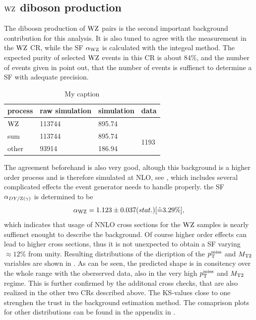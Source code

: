 \subsection{$\mathrm{W}\mathrm{Z}$ diboson production}
The diboosn production of $\mathrm{W}\mathrm{Z}$ pairs is the second important background contribution for this analysis. It is also tuned to agree with the measurement in the $\mathrm{W}\mathrm{Z}$ CR, while the SF $\alpha_{\mathrm{W}\mathrm{Z}}$ is calculated with the integeal method. The expected purity of selected $\mathrm{W}\mathrm{Z}$ events in this CR is about $84\%$, and the number of events given in  point out, that the number of events is suffienct to determine a SF with adequate precision.
\begin{table}[htb]
 \centering
 \caption{My caption}
 \label{tab:CRWZ}
 \begin{tabular}{llll}
  process  & raw simulation & simulation & data                  \\\hline
  $\mathrm{W}\mathrm{Z}$ & 113744         & 895.74     &                       \\\hline\hline
  sum      & 113744         & 895.74     & \multirow{2}{*}{1193} \\
  other    & 93914          & 186.94     &                       
 \end{tabular}
\end{table}
The agreement beforehand is also very good, altough this background is a higher order process and is therefore simulated at NLO, see , which includes several complicated effects the event generator needs to handle properly. the SF $\alpha_{DY/\mathrm{Z}(\gamma)}$ is determined to be
\begin{equation}\label{eq:AlphaWZ}
 \alpha_{\mathrm{W}\mathrm{Z}}=1.123 \pm 0.037 (stat.) [\hat{=}3.29\%],
\end{equation}
which indicates that usage of NNLO cross sections for the $\mathrm{W}\mathrm{Z}$ samples is nearly suffienct enought to describe the background. Of course higher order effects can lead to higher cross sections, thus it is not unexpected to obtain a SF varying $\approx12\%$ from unity. Resulting distributions of the dicription of the $p_{\mathrm{T}}^\text{miss}$ and $M_{\mathrm{T2}}$ variables are shown in . As can be seen, the predicted shape is in consitency over the whole range with the oberserved data, also in the very high $p_{\mathrm{T}}^\text{miss}$ and $M_{\mathrm{T2}}$ regime. This is further confirmed by the additonal cross checks, that are also realized in the other two CRs described above. The KS-values close to one strenghen the trust in the background estimation method. The comaprison plots for other distributions can be found in the appendix in .

